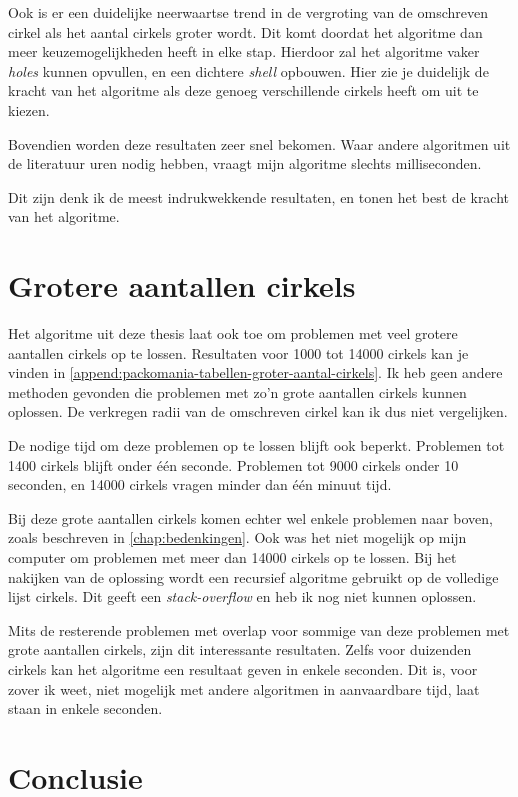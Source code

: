 \documentclass[12pt,a4paper,oneside]{book}
\begin{document}
Ook is er een duidelijke neerwaartse trend in de vergroting van de omschreven cirkel als het aantal cirkels groter wordt.
Dit komt doordat het algoritme dan meer keuzemogelijkheden heeft in elke stap.
Hierdoor zal het algoritme vaker \textit{holes} kunnen opvullen, en een dichtere \textit{shell} opbouwen.
Hier zie je duidelijk de kracht van het algoritme als deze genoeg verschillende cirkels heeft om uit te kiezen.

Bovendien worden deze resultaten zeer snel bekomen.
Waar andere algoritmen uit de literatuur uren nodig hebben, vraagt mijn algoritme slechts milliseconden.

Dit zijn denk ik de meest indrukwekkende resultaten, en tonen het best de kracht van het algoritme.

\section{Grotere aantallen cirkels}

Het algoritme uit deze thesis laat ook toe om problemen met veel grotere aantallen cirkels op te lossen.
Resultaten voor 1000 tot 14000 cirkels kan je vinden in \autoref{append:packomania-tabellen-groter-aantal-cirkels}.
Ik heb geen andere methoden gevonden die problemen met zo'n grote aantallen cirkels kunnen oplossen.
De verkregen radii van de omschreven cirkel kan ik dus niet vergelijken.

De nodige tijd om deze problemen op te lossen blijft ook beperkt.
Problemen tot 1400 cirkels blijft onder één seconde.
Problemen tot 9000 cirkels onder 10 seconden, en 14000 cirkels vragen minder dan één minuut tijd.

Bij deze grote aantallen cirkels komen echter wel enkele problemen naar boven, zoals beschreven in \autoref{chap:bedenkingen}.
Ook was het niet mogelijk op mijn computer om problemen met meer dan 14000 cirkels op te lossen.
Bij het nakijken van de oplossing wordt een recursief algoritme gebruikt op de volledige lijst cirkels.
Dit geeft een \textit{stack-overflow} en heb ik nog niet kunnen oplossen.

Mits de resterende problemen met overlap voor sommige van deze problemen met grote aantallen cirkels, zijn dit interessante resultaten.
Zelfs voor duizenden cirkels kan het algoritme een resultaat geven in enkele seconden.
Dit is, voor zover ik weet, niet mogelijk met andere algoritmen in aanvaardbare tijd, laat staan in enkele seconden.

\section{Conclusie}
\end{document}
